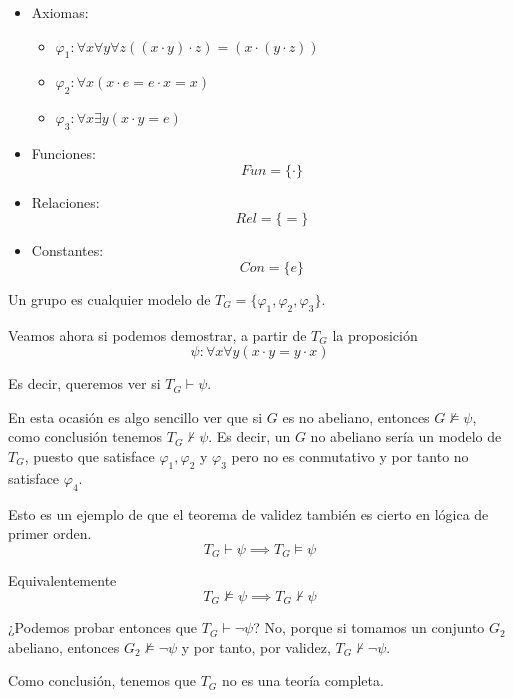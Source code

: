 \begin{example}\mbox{}

\begin{itemize}

	\item Axiomas:
	\begin{itemize}
		\vspace{-3mm}
		\item $\varphi_1: \forall x\forall y\forall z ((x\cdot y)\cdot z) = (x\cdot(y\cdot z))$
		\item $\varphi_2: \forall x(x\cdot e = e\cdot x = x)$
		\item $\varphi_3: \forall x\exists y (x\cdot y = e)$
	\end{itemize}

	\item Funciones:
	$$Fun = \{\cdot\}$$
	
	\item Relaciones:
	$$Rel = \{=\}$$
	
	\item Constantes:
	$$Con = \{e\}$$
\end{itemize}

Un grupo es cualquier modelo de $T_G = \{\varphi_1, \varphi_2, \varphi_3\}$. 

Veamos ahora si podemos demostrar, a partir de $T_G$ la proposición 
\[\psi: \forall x\forall y(x\cdot y = y\cdot x)\]

Es decir, queremos ver si $T_G\vdash \psi$. 

En esta ocasión es algo sencillo ver que si $G$ es no abeliano, entonces $G\nvDash \psi$, como conclusión tenemos $T_G\nvdash \psi$. Es decir, un $G$ no abeliano sería un modelo de $T_G$, puesto que satisface $\varphi_1, \varphi_2$ y $\varphi_3$ pero no es conmutativo y por tanto no satisface $\varphi_4$. 

Esto es un ejemplo de que el teorema de validez también es cierto en lógica de primer orden.
$$T_G\vdash \psi \implies T_G \vDash \psi$$

Equivalentemente
$$T_G\nvDash \psi \implies T_G \nvdash \psi$$

¿Podemos probar entonces que $T_G\vdash \neg \psi$? No, porque si tomamos un conjunto $G_2$ abeliano, entonces $G_2\nvDash \neg\psi$ y por tanto, por validez, $T_G\nvdash \neg \psi$.

Como conclusión, tenemos que $T_G$ no es una teoría completa.
\end{example}


